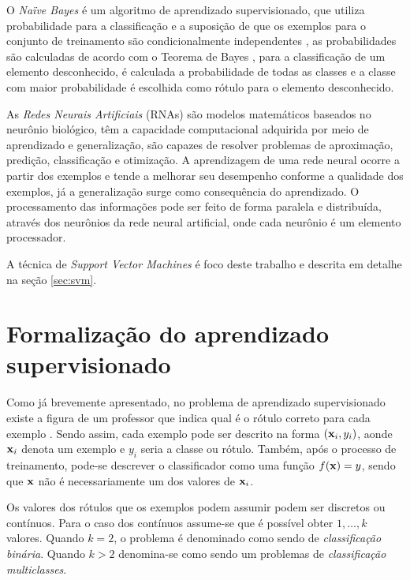 O \emph{Naïve Bayes} é um algoritmo de aprendizado supervisionado, que utiliza probabilidade para a classificação e a suposição de que os exemplos para o conjunto de treinamento são condicionalmente independentes \cite{de-categorizacao}, as probabilidades são calculadas de acordo com o Teorema de Bayes \cite{kim2003poisson}, para a classificação de um elemento desconhecido, é calculada a probabilidade de todas as classes e a classe com maior probabilidade é escolhida como rótulo para o elemento desconhecido. ~\cite{pardo2002aprendizado}

As \emph{Redes Neurais Artificiais} (RNAs) são modelos matemáticos baseados no neurônio biológico, têm a capacidade computacional adquirida por meio de aprendizado e generalização, são capazes de resolver problemas de aproximação, predição, classificação e otimização. A aprendizagem de uma rede neural ocorre a partir dos exemplos e tende a melhorar seu desempenho conforme a qualidade dos exemplos, já a generalização surge como consequência do aprendizado. O processamento das informações pode ser feito de forma paralela e distribuída, através dos neurônios da rede neural artificial, onde cada neurônio é um elemento processador.~\cite{rezende2003sistemas}

A técnica de \emph{Support Vector Machines} é foco deste trabalho e descrita em detalhe na se\c{c}ão \ref{sec:svm}.

\section{Formalização do aprendizado supervisionado}

Como já brevemente apresentado, no problema de aprendizado supervisionado existe a figura de um professor que indica qual é o rótulo correto para cada exemplo . Sendo assim, cada exemplo pode ser descrito na forma $(\mathbf{x}_i, y_i)$, aonde $\mathbf{x}_i$ denota um exemplo e $y_i$ seria a classe ou rótulo. Também, após o processo de treinamento, pode-se descrever o classificador como uma função $f(\mathbf{x}) = y$, sendo que $\mathbf{x}$ não é necessariamente um dos valores de $\mathbf{x}_i$.

Os valores dos rótulos que os exemplos podem assumir podem ser discretos ou contínuos. Para o caso dos contínuos assume-se que é possível obter $1,\dotsc,k$ valores. Quando $k = 2$, o problema é denominado como sendo de \emph{classificação binária}. Quando $k > 2$ denomina-se como sendo um problemas de \emph{classificação multiclasses}.


